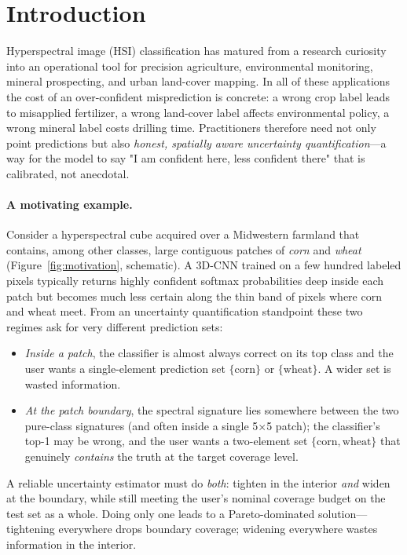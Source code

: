\documentclass[11pt]{article}
\newcommand{\1}{\mathbf{1}}
\begin{document}
\section{Introduction}
\label{sec:intro}

Hyperspectral image (HSI) classification has matured from a research curiosity into an operational tool for precision agriculture, environmental monitoring, mineral prospecting, and urban land-cover mapping. In all of these applications the cost of an over-confident misprediction is concrete: a wrong crop label leads to misapplied fertilizer, a wrong land-cover label affects environmental policy, a wrong mineral label costs drilling time. Practitioners therefore need not only point predictions but also \emph{honest, spatially aware uncertainty quantification}---a way for the model to say "I am confident here, less confident there" that is calibrated, not anecdotal.

\paragraph{A motivating example.}
Consider a hyperspectral cube acquired over a Midwestern farmland that contains, among other classes, large contiguous patches of \emph{corn} and \emph{wheat} (Figure~\ref{fig:motivation}, schematic). A 3D-CNN trained on a few hundred labeled pixels typically returns highly confident softmax probabilities deep inside each patch but becomes much less certain along the thin band of pixels where corn and wheat meet. From an uncertainty quantification standpoint these two regimes ask for very different prediction sets:
\begin{itemize}[topsep=2pt,itemsep=2pt,leftmargin=1.5em]
    \item \emph{Inside a patch}, the classifier is almost always correct on its top class and the user wants a single-element prediction set $\{\text{corn}\}$ or $\{\text{wheat}\}$. A wider set is wasted information.
    \item \emph{At the patch boundary}, the spectral signature lies somewhere between the two pure-class signatures (and often inside a single 5$\times$5 patch); the classifier's top-1 may be wrong, and the user wants a two-element set $\{\text{corn}, \text{wheat}\}$ that genuinely \emph{contains} the truth at the target coverage level.
\end{itemize}
A reliable uncertainty estimator must do \emph{both}: tighten in the interior \emph{and} widen at the boundary, while still meeting the user's nominal coverage budget on the test set as a whole. Doing only one leads to a Pareto-dominated solution---tightening everywhere drops boundary coverage; widening everywhere wastes information in the interior.
\end{document}
